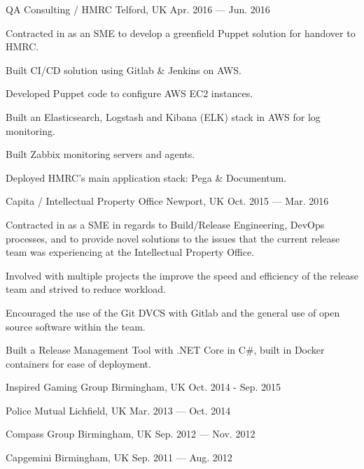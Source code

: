 \begin{cventries}
    {QA Consulting / HMRC} %
    {Telford, UK} %
    {Apr. 2016 — Jun. 2016} %
    {
        \begin{cvitems} %
        \item {Contracted in as an SME to develop a greenfield Puppet solution for handover to HMRC.}
        \item {Built CI/CD solution using Gitlab \& Jenkins on AWS.}
        \item {Developed Puppet code to configure AWS EC2 instances.}
        \item{Built an Elasticsearch, Logstash and Kibana (ELK) stack in AWS for log monitoring.}
        \item {Built Zabbix monitoring servers and agents.}
        \item {Deployed HMRC's main application stack: Pega \& Documentum.}
        \end{cvitems}
    }


    {Capita / Intellectual Property Office} %
    {Newport, UK} %
    {Oct. 2015 — Mar. 2016} %
    {
        \begin{cvitems} %
        \item {Contracted in as a SME in regards to Build/Release Engineering, DevOps processes, and to provide novel solutions to the issues that the current release team was experiencing at the Intellectual Property Office.}
        \item {Involved with multiple projects the improve the speed and efficiency of the release team and strived to reduce workload.}
        \item {Encouraged the use of the Git DVCS with Gitlab and the general use of open source software within the team.}
        \item {Built a Release Management Tool with .NET Core in C\#, built in Docker containers for ease of deployment.}
        \end{cvitems}
    }


    {Inspired Gaming Group} %
    {Birmingham, UK} %
    {Oct. 2014 - Sep. 2015} %
    {}


    {Police Mutual} %
    {Lichfield, UK} %
    {Mar. 2013 — Oct. 2014} %
    {}

    {Compass Group} %
    {Birmingham, UK} %
    {Sep. 2012 — Nov. 2012} %
    {}

    {Capgemini} %
    {Birmingham, UK} %
    {Sep. 2011 — Aug. 2012} %
    {}

\end{cventries}
